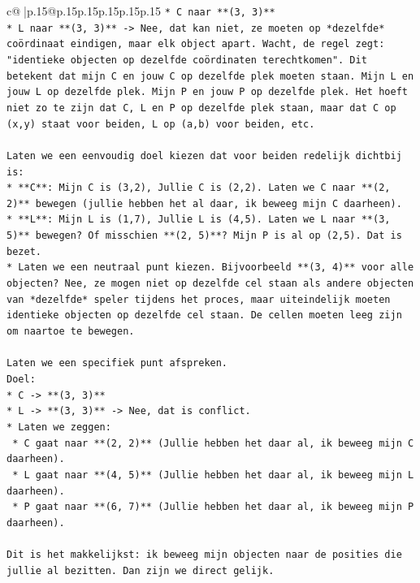 \documentclass{article}
\begin{document}
{\begin{supertabular}{c@{$\;$}|p{.15\linewidth}@{}p{.15\linewidth}p{.15\linewidth}p{.15\linewidth}p{.15\linewidth}p{.15\linewidth}}
{{{\texttt{*   C naar **(3, 3)**} \\
\texttt{*   L naar **(3, 3)** {-}> Nee, dat kan niet, ze moeten op *dezelfde* coördinaat eindigen, maar elk object apart. Wacht, de regel zegt: "identieke objecten op dezelfde coördinaten terechtkomen". Dit betekent dat mijn C en jouw C op dezelfde plek moeten staan. Mijn L en jouw L op dezelfde plek. Mijn P en jouw P op dezelfde plek. Het hoeft niet zo te zijn dat C, L en P op dezelfde plek staan, maar dat C op (x,y) staat voor beiden, L op (a,b) voor beiden, etc.} \\
\\ 
\texttt{Laten we een eenvoudig doel kiezen dat voor beiden redelijk dichtbij is:} \\
\texttt{*   **C**: Mijn C is (3,2), Jullie C is (2,2). Laten we C naar **(2, 2)** bewegen (jullie hebben het al daar, ik beweeg mijn C daarheen).} \\
\texttt{*   **L**: Mijn L is (1,7), Jullie L is (4,5). Laten we L naar **(3, 5)** bewegen? Of misschien **(2, 5)**? Mijn P is al op (2,5). Dat is bezet.} \\
\texttt{*   Laten we een neutraal punt kiezen. Bijvoorbeeld **(3, 4)** voor alle objecten? Nee, ze mogen niet op dezelfde cel staan als andere objecten van *dezelfde* speler tijdens het proces, maar uiteindelijk moeten identieke objecten op dezelfde cel staan. De cellen moeten leeg zijn om naartoe te bewegen.} \\
\\ 
\texttt{Laten we een specifiek punt afspreken.} \\
\texttt{Doel:} \\
\texttt{*   C {-}> **(3, 3)**} \\
\texttt{*   L {-}> **(3, 3)** {-}> Nee, dat is conflict.} \\
\texttt{*   Laten we zeggen:} \\
\texttt{    *   C gaat naar **(2, 2)** (Jullie hebben het daar al, ik beweeg mijn C daarheen).} \\
\texttt{    *   L gaat naar **(4, 5)** (Jullie hebben het daar al, ik beweeg mijn L daarheen).} \\
\texttt{    *   P gaat naar **(6, 7)** (Jullie hebben het daar al, ik beweeg mijn P daarheen).} \\
\\ 
\texttt{Dit is het makkelijkst: ik beweeg mijn objecten naar de posities die jullie al bezitten. Dan zijn we direct gelijk.} \\
\\ 
}}}
\end{supertabular}}
\end{document}
